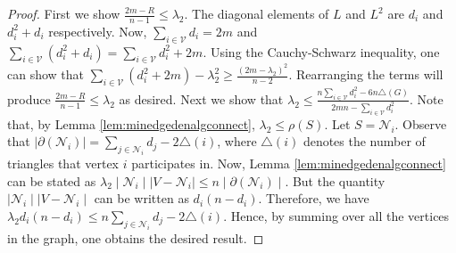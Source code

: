 \documentclass[reqno,8pt]{amsart}
\theoremstyle{definition}
\theoremstyle{remark}
\numberwithin{equation}{section}
\def\cN{\mathcal{N}}
\def\cV{\mathcal{V}}
\begin{document}
\begin{proof}
First we show $\frac{2m - R}{n-1} \leq \lambda_2$. The diagonal elements of $L$ and $L^2$ are $d_i$ and $d_i^2+d_i$ respectively. Now, $\sum_{i \in \cV} d_i = 2m$ and $\sum_{i \in \cV}(d_i^2 + d_i) = \sum_{i \in \cV} d_i^2 + 2m$. Using the Cauchy-Schwarz inequality, one can show that $\sum_{i \in \cV} (d_i^2 + 2m) - \lambda_2^2 \geq \frac{(2m-\lambda_2)^2}{n-2}$. Rearranging the terms will produce $\frac{2m - R}{n-1} \leq \lambda_2$ as desired. Next we show that $\lambda_2 \leq \frac{n \sum_{i \in \cV}d_i^2 - 6n\triangle(G)}{2mn - \sum_{i \in \cV} d_i^2}$. Note that, by Lemma \ref{lem:minedgedenalgconnect}, $\lambda_2 \leq \rho(S)$. Let $S = \cN_i$. Observe that $\mid \partial (\cN_i) \mid = \sum_{j \in \cN_i} d_j - 2\triangle(i)$, where $\triangle(i)$ denotes the number of triangles that vertex $i$ participates in. Now, Lemma \ref{lem:minedgedenalgconnect} can be stated as $\lambda_2 \mid \cN_i \mid \mid V - \cN_i \mid \leq n \mid \partial(\cN_i) \mid$.
But the quantity $\mid \cN_i \mid \mid V - \cN_i \mid$ can be written as $d_i (n-d_i)$. Therefore, we have $\lambda_2 d_i (n-d_i) \leq n\sum_{j \in \cN_i} d_j - 2\triangle(i)$.
Hence, by summing over all the vertices in the graph, one obtains the desired result.
\end{proof}
\end{document}
